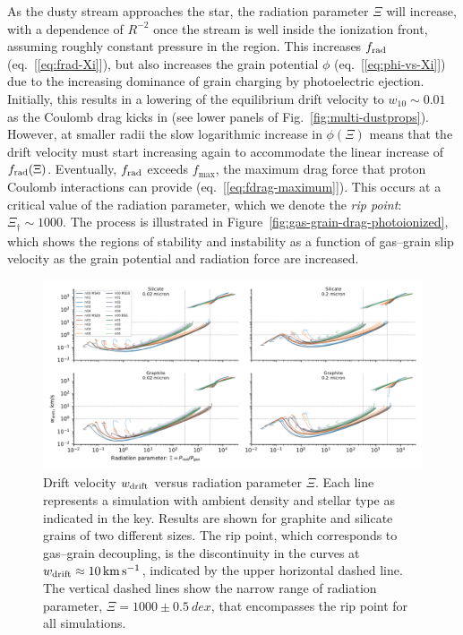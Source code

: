 As the dusty stream approaches the star, the radiation parameter
\(\Xi\) will increase, with a dependence of \(R^{-2}\) once the stream
is well inside the ionization front, assuming roughly constant
pressure in the \hii{} region.  This increases \(f_{\text{rad}}\)
(eq.~[\ref{eq:frad-Xi}]), but also increases the grain potential
\(\phi\) (eq.~[\ref{eq:phi-vs-Xi}]) due to the increasing dominance of
grain charging by photoelectric ejection.  Initially, this results in
a lowering of the equilibrium drift velocity to \(w_{10} \sim 0.01\) as
the Coulomb drag kicks in (see lower panels of
Fig.~\ref{fig:multi-dustprops}).  However, at smaller radii the slow
logarithmic increase in \(\phi(\Xi)\) means that the drift velocity must
start increasing again to accommodate the linear increase of
\(f_{\text{rad}}(\Xi)\).  Eventually, \(f_{\text{rad}}\) exceeds \(f_{\mathrm{max}}\), the
maximum drag force that proton Coulomb interactions can provide
(eq.~[\ref{eq:fdrag-maximum}]).  This occurs at a critical value of
the radiation parameter, which we denote the \textit{rip point}:
\(\Xi_\dag \sim 1000\). The process is illustrated in
Figure~\ref{fig:gas-grain-drag-photoionized}, which shows the regions
of stability and instability as a function of gas--grain slip velocity
as the grain potential and radiation force are increased.

\begin{figure}
  \includegraphics[width=\linewidth]{figs/drift-pratio-4panel}
  \caption{Drift velocity \(w_{\text{drift}}\) versus radiation parameter
    \(\Xi\). Each line represents a simulation with ambient density and
    stellar type as indicated in the key.  Results are shown for
    graphite and silicate grains of two different sizes.  The rip
    point, which corresponds to gas--grain decoupling, is the
    discontinuity in the curves at
    \(w_{\text{drift}} \approx \SI{10}{km.s^{-1}}\), indicated by the upper
    horizontal dashed line.  The vertical dashed lines show the narrow
    range of radiation parameter, \(\Xi = 1000 \pm \SI{0.5}{dex}\), that
    encompasses the rip point for all simulations. }
  \label{fig:drift-gn}
\end{figure}

